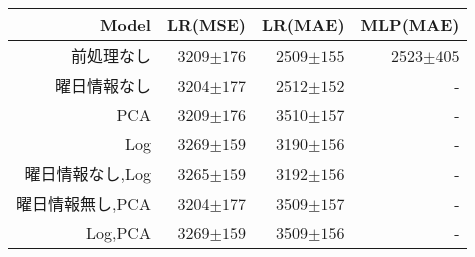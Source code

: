 \begin{tabular}{rrrr}
    \hline
    \hline
    Model & LR(MSE) & LR(MAE) & MLP(MAE)\\
    \hline
    前処理なし & 3209$\pm176$ & 2509$\pm155$ & 2523$\pm405$\\
    曜日情報なし & 3204$\pm177$ & 2512$\pm152$ & -\\
    PCA & 3209$\pm176$ & 3510$\pm157$ & -\\
    Log & 3269$\pm159$ & 3190$\pm156$ & -\\
    曜日情報なし,Log & 3265$\pm159$ & 3192$\pm156$ & -\\
    曜日情報無し,PCA & 3204$\pm177$ & 3509$\pm157$ & -\\
    Log,PCA & 3269$\pm159$ & 3509$\pm156$ & -\\
    \hline
\end{tabular}
